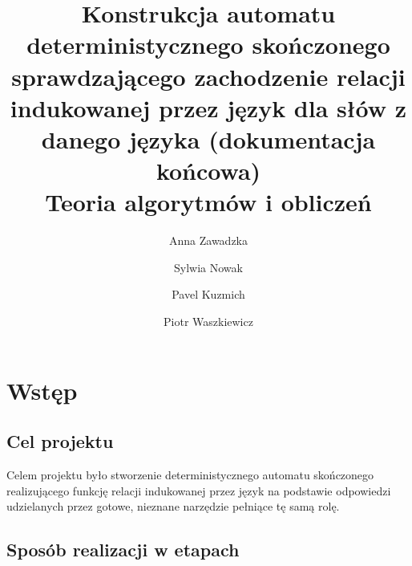 \documentclass[runningheads,a4paper]{llncs}
\begin{document}
\vspace{-100pt}
\mainmatter  %
\title{Konstrukcja automatu deterministycznego skończonego sprawdzającego zachodzenie relacji indukowanej przez język dla słów z danego języka (dokumentacja końcowa)\\Teoria algorytmów i obliczeń}


%
%
\author{Anna Zawadzka\and Sylwia Nowak\and Pavel Kuzmich\and Piotr Waszkiewicz}
%
\authorrunning{}

%
%

\maketitle

\tableofcontents

\newpage

\section{Wstęp}

\subsection{Cel projektu}

Celem projektu było stworzenie deterministycznego automatu skończonego realizującego funkcję relacji indukowanej przez język na podstawie odpowiedzi udzielanych przez gotowe, nieznane narzędzie pełniące tę samą rolę.

\subsection{Sposób realizacji w etapach}
\end{document}
